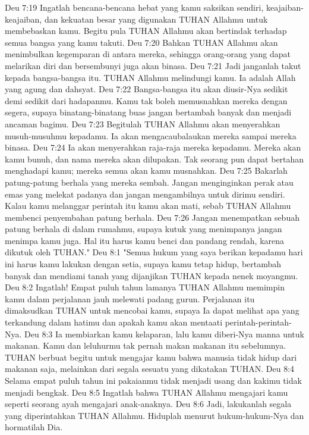 Deu 7:19  Ingatlah bencana-bencana hebat yang kamu saksikan sendiri, keajaiban-keajaiban, dan kekuatan besar yang digunakan TUHAN Allahmu untuk membebaskan kamu. Begitu pula TUHAN Allahmu akan bertindak terhadap semua bangsa yang kamu takuti.
Deu 7:20  Bahkan TUHAN Allahmu akan menimbulkan kegemparan di antara mereka, sehingga orang-orang yang dapat melarikan diri dan bersembunyi juga akan binasa.
Deu 7:21  Jadi janganlah takut kepada bangsa-bangsa itu. TUHAN Allahmu melindungi kamu. Ia adalah Allah yang agung dan dahsyat.
Deu 7:22  Bangsa-bangsa itu akan diusir-Nya sedikit demi sedikit dari hadapanmu. Kamu tak boleh memusnahkan mereka dengan segera, supaya binatang-binatang buas jangan bertambah banyak dan menjadi ancaman bagimu.
Deu 7:23  Begitulah TUHAN Allahmu akan menyerahkan musuh-musuhmu kepadamu. Ia akan mengacaubalaukan mereka sampai mereka binasa.
Deu 7:24  Ia akan menyerahkan raja-raja mereka kepadamu. Mereka akan kamu bunuh, dan nama mereka akan dilupakan. Tak seorang pun dapat bertahan menghadapi kamu; mereka semua akan kamu musnahkan.
Deu 7:25  Bakarlah patung-patung berhala yang mereka sembah. Jangan menginginkan perak atau emas yang melekat padanya dan jangan mengambilnya untuk dirimu sendiri. Kalau kamu melanggar perintah itu kamu akan mati, sebab TUHAN Allahmu membenci penyembahan patung berhala.
Deu 7:26  Jangan menempatkan sebuah patung berhala di dalam rumahmu, supaya kutuk yang menimpanya jangan menimpa kamu juga. Hal itu harus kamu benci dan pandang rendah, karena dikutuk oleh TUHAN."
Deu 8:1  "Semua hukum yang saya berikan kepadamu hari ini harus kamu lakukan dengan setia, supaya kamu tetap hidup, bertambah banyak dan mendiami tanah yang dijanjikan TUHAN kepada nenek moyangmu.
Deu 8:2  Ingatlah! Empat puluh tahun lamanya TUHAN Allahmu memimpin kamu dalam perjalanan jauh melewati padang gurun. Perjalanan itu dimaksudkan TUHAN untuk mencobai kamu, supaya Ia dapat melihat apa yang terkandung dalam hatimu dan apakah kamu akan mentaati perintah-perintah-Nya.
Deu 8:3  Ia membiarkan kamu kelaparan, lalu kamu diberi-Nya manna untuk makanan. Kamu dan leluhurmu tak pernah makan makanan itu sebelumnya. TUHAN berbuat begitu untuk mengajar kamu bahwa manusia tidak hidup dari makanan saja, melainkan dari segala sesuatu yang dikatakan TUHAN.
Deu 8:4  Selama empat puluh tahun ini pakaianmu tidak menjadi usang dan kakimu tidak menjadi bengkak.
Deu 8:5  Ingatlah bahwa TUHAN Allahmu mengajari kamu seperti seorang ayah mengajari anak-anaknya.
Deu 8:6  Jadi, lakukanlah segala yang diperintahkan TUHAN Allahmu. Hiduplah menurut hukum-hukum-Nya dan hormatilah Dia.
